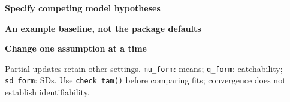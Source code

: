 \documentclass[
  9pt,
  landscape]{extarticle}
\newcommand{\smallkey}[1]{{\color{black}\bfseries #1}}
\newcommand{\panelnote}[1]{{\color{tamgrey}\fontsize{7.0}{9.3}\selectfont #1}}
\newcommand{\sectitle}[3]{%
  \noindent\begingroup
  \setlength{\fboxsep}{1.5mm}%
  \colorbox{#3}{\parbox{\dimexpr\linewidth-2\fboxsep\relax}{%
    \color{white}\bfseries\fontsize{13}{15}\selectfont #1\quad #2}}%
  \endgroup\par\vspace{1.2mm}
}
\begin{document}
\vspace{2mm}
\sectitle{2}{Specify competing model hypotheses}{tamteal}
\begin{minipage}[t]{.43\linewidth}\vspace{0pt}
\smallkey{An example baseline, not the package defaults}\par\vspace{.6mm}
\end{minipage}\hfill
\begin{minipage}[t]{.55\linewidth}\vspace{0pt}
\smallkey{Change one assumption at a time}\par\vspace{.6mm}
\begin{minipage}[t]{.49\linewidth}\vspace{-2mm}
\end{minipage}\hfill
\begin{minipage}[t]{.49\linewidth}\vspace{-2mm}
\end{minipage}\par\vspace{.5mm}
\par\vspace{1mm}
\panelnote{Partial updates retain other settings. \texttt{mu\_form}: means; \texttt{q\_form}: catchability; \texttt{sd\_form}: SDs. Use \texttt{check\_tam()} before comparing fits; convergence does not establish identifiability.}
\end{minipage}
\end{document}
